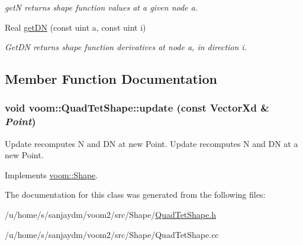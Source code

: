 \begin{DoxyCompactItemize}
\begin{DoxyCompactList}\small\item\em getN returns shape function values at a given node a. \item\end{DoxyCompactList}\item 
\hypertarget{classvoom_1_1_quad_tet_shape_a61a6d7d67989036ca050059077792928}{
Real \hyperlink{classvoom_1_1_quad_tet_shape_a61a6d7d67989036ca050059077792928}{getDN} (const uint a, const uint i)}
\label{classvoom_1_1_quad_tet_shape_a61a6d7d67989036ca050059077792928}

\begin{DoxyCompactList}\small\item\em GetDN returns shape function derivatives at node a, in direction i. \item\end{DoxyCompactList}\end{DoxyCompactItemize}


\subsection{Member Function Documentation}
\hypertarget{classvoom_1_1_quad_tet_shape_a299d2a86a8444228197fa93fae54d45e}{
\subsubsection[{update}]{\setlength{\rightskip}{0pt plus 5cm}void voom::QuadTetShape::update (const VectorXd \& {\em Point})}}
\label{classvoom_1_1_quad_tet_shape_a299d2a86a8444228197fa93fae54d45e}


Update recomputes N and DN at new Point. Update recomputes N and DN at a new Point. 

Implements \hyperlink{classvoom_1_1_shape_a8ded544de12647543b056cec61be9f26}{voom::Shape}.

The documentation for this class was generated from the following files:\begin{DoxyCompactItemize}
\item 
/u/home/s/sanjaydm/voom2/src/Shape/\hyperlink{_quad_tet_shape_8h}{QuadTetShape.h}\item 
/u/home/s/sanjaydm/voom2/src/Shape/QuadTetShape.cc\end{DoxyCompactItemize}
